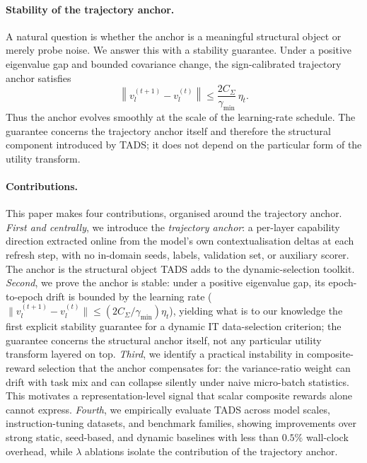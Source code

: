 \paragraph{Stability of the trajectory anchor.}
A natural question is whether the anchor is a meaningful structural
object or merely probe noise. We answer this with a stability
guarantee. Under a positive eigenvalue gap and bounded covariance
change, the sign-calibrated trajectory anchor satisfies
\[
\left\|
v_l^{(t+1)}-v_l^{(t)}
\right\|
\le
\frac{2C_\Sigma}{\gamma_{\min}}\,\eta_t .
\]
Thus the anchor evolves smoothly at the scale of the learning-rate
schedule. The guarantee concerns the trajectory anchor itself and
therefore the structural component introduced by \textsc{TADS}; it
does not depend on the particular form of the utility transform.

\paragraph{Contributions.}
This paper makes four contributions, organised around the
trajectory anchor. \emph{First and centrally}, we introduce the
\emph{trajectory anchor}: a per-layer capability direction
extracted online from the model's own contextualisation deltas at
each refresh step, with no in-domain seeds, labels, validation
set, or auxiliary scorer. The anchor is the structural object
TADS adds to the dynamic-selection toolkit. \emph{Second}, we
prove the anchor is stable: under a positive eigenvalue gap, its
epoch-to-epoch drift is bounded by the learning rate
($\|v_l^{(t+1)}-v_l^{(t)}\| \le (2C_\Sigma/\gamma_{\min})\eta_t$),
yielding what is to our knowledge the first explicit stability
guarantee for a dynamic IT data-selection criterion; the
guarantee concerns the structural anchor itself, not any
particular utility transform layered on top. \emph{Third}, we
identify a practical instability in composite-reward selection
that the anchor compensates for: the variance-ratio weight can
drift with task mix and can collapse silently under naive
micro-batch statistics. This motivates a representation-level
signal that scalar composite rewards alone cannot express.
\emph{Fourth}, we empirically evaluate \textsc{TADS} across model
scales, instruction-tuning datasets, and benchmark families,
showing improvements over strong static, seed-based, and dynamic
baselines with less than $0.5\%$ wall-clock overhead, while
$\lambda$ ablations isolate the contribution of the trajectory
anchor.
